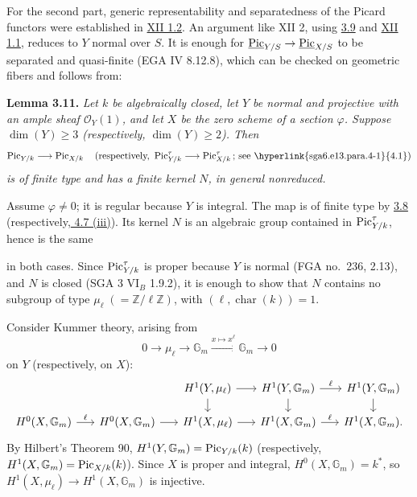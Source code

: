 For the second part, generic representability and separatedness of the
Picard functors were established in \hyperlink{sga6.e12.cor.1-2}{XII 1.2}. An argument like XII 2,
using \hyperlink{sga6.e13.lem.3-9}{3.9} and \hyperlink{sga6.e12.thm.1-1}{XII 1.1}, reduces to \(Y\) normal over \(S\). It is enough
for \(\underline{\operatorname{Pic}}_{Y/S}\to\underline{\operatorname{Pic}}_{X/S}\) to be separated
and quasi-finite (EGA IV 8.12.8), which can be checked on geometric
fibers and follows from:

\textbf{Lemma 3.11.} \emph{Let \(k\) be algebraically closed, let \(Y\)
be normal and projective with an ample sheaf \(\mathcal O_Y(1)\), and let
\(X\) be the zero scheme of a section \(\varphi\). Suppose
\(\dim(Y)\ge3\) (respectively, \(\dim(Y)\ge2\)). Then}
\[
\Pic_{Y/k}\longrightarrow\Pic_{X/k}
\quad
\text{(respectively, }\Pic^\tau_{Y/k}\longrightarrow\Pic^\tau_{X/k}
\text{; see \hyperlink{sga6.e13.para.4-1}{4.1})}
\]
\emph{is of finite type and has a finite kernel \(N\), in general
nonreduced.}

Assume \(\varphi\ne0\); it is regular because \(Y\) is integral. The map
is of finite type by \hyperlink{sga6.e13.thm.3-8}{3.8} (respectively,\hyperlink{sga6.e13.thm.4-7}{ 4.7 (iii)}). Its kernel \(N\) is
an algebraic group contained in \(\operatorname{Pic}^\tau_{Y/k}\), hence is the same

in both cases. Since \(\operatorname{Pic}^\tau_{Y/k}\) is proper because \(Y\) is
normal (FGA no.~236, 2.13), and \(N\) is closed (SGA 3 VI\(_B\) 1.9.2),
it is enough to show that \(N\) contains no subgroup of type
\(\mu_\ell\;(=\mathbb Z/\ell\mathbb Z)\), with
\((\ell,\operatorname{char}(k))=1\).

Consider Kummer theory, arising from
\[
0\longrightarrow\mu_\ell\longrightarrow\mathbb G_m
\xrightarrow{x\mapsto x^\ell}\mathbb G_m\longrightarrow0
\]
on \(Y\) (respectively, on \(X\)):
\[
\begin{tikzcd}[column sep=1.6em,row sep=1.2em]
&&H^1(Y,\mu_\ell)\arrow[r]\arrow[d]&
H^1(Y,\mathbb G_m)\arrow[r,"\ell"]\arrow[d]&
H^1(Y,\mathbb G_m)\arrow[d]\\
H^0(X,\mathbb G_m)\arrow[r,"\ell"]&
H^0(X,\mathbb G_m)\arrow[r]&
H^1(X,\mu_\ell)\arrow[r]&
H^1(X,\mathbb G_m)\arrow[r,"\ell"]&
H^1(X,\mathbb G_m).
\end{tikzcd}
\]
By Hilbert's Theorem 90, \(H^1(Y,\mathbb G_m)=\operatorname{Pic}_{Y/k}(k)\)
(respectively, \(H^1(X,\mathbb G_m)=\operatorname{Pic}_{X/k}(k)\)). Since \(X\) is
proper and integral, \(H^0(X,\mathbb G_m)=k^*\), so
\(H^1(X,\mu_\ell)\to H^1(X,\mathbb G_m)\) is injective.

